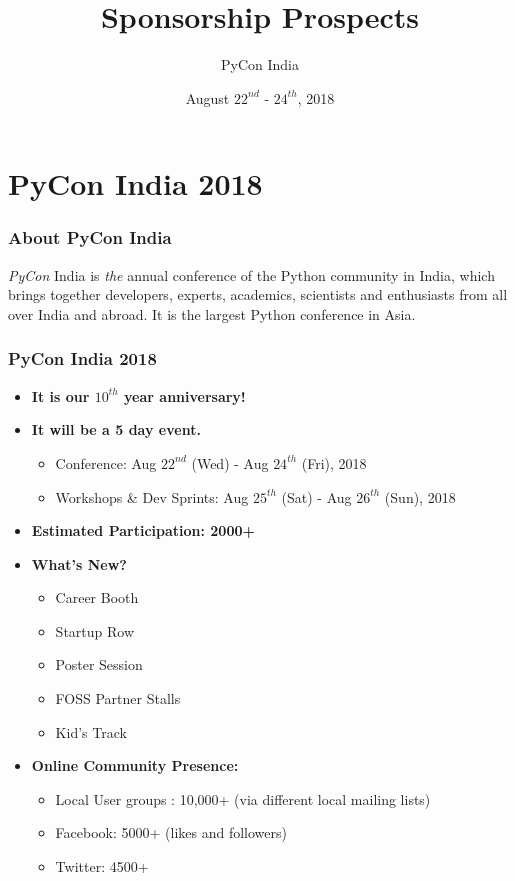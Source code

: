 \documentclass[10pt, compress, aspectratio=169]{beamer}
\title{Sponsorship Prospects}
\subtitle{}
\date{August $22^{nd}$ - $24^{th}$, 2018}
\author{PyCon India}
\institute{Bangalore International Exhibition Center}
\begin{document}
\maketitle

\section{PyCon India 2018}
\begin{frame}[fragile]
  \frametitle{About PyCon India}
  \emph{PyCon} India is \textit{the} annual conference of the Python community in India, which brings together developers, experts, academics, scientists and enthusiasts from all over India and abroad. It is the largest Python conference in Asia.
\end{frame}

\begin{frame}[fragile]
  \frametitle{PyCon India 2018}
  \begin{itemize}
      \item \textbf{It is our $10^{th}$ year anniversary!}
      \item \textbf{It will be a 5 day event.}
      \begin{itemize}
          \item Conference: Aug $22^{nd}$ (Wed) - Aug $24^{th}$ (Fri), 2018
          \item Workshops \& Dev Sprints: Aug $25^{th}$ (Sat) - Aug $26^{th}$ (Sun), 2018
      \end{itemize}
      \item \textbf{Estimated Participation: 2000+}
      \item \textbf{What’s New?}
      \begin{itemize}
          \item Career Booth
          \item Startup Row
          \item Poster Session
          \item FOSS Partner Stalls
          \item Kid’s Track
      \end{itemize}
      \item \textbf{Online Community Presence:}
      \begin{itemize}
          \item Local User groups : 10,000+ (via different local mailing lists)
          \item Facebook: 5000+ (likes and followers)
          \item Twitter: 4500+
      \end{itemize}
  \end{itemize}
\end{frame}
\end{document}
